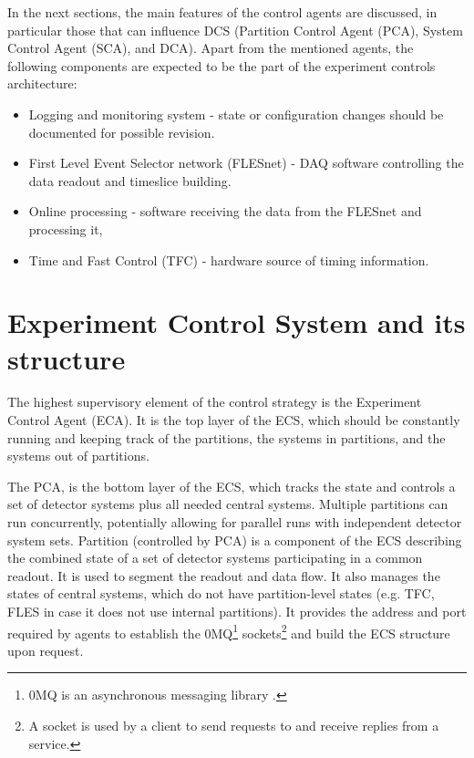  In the next sections, the main features of the control agents are discussed, in particular those that can influence \gls{DCS} (Partition Control Agent (\gls{PCA}), System Control Agent (\gls{SCA}), and \gls{DCA}). Apart from the mentioned agents, the following components are expected to be the part of the experiment controls architecture: 
 \begin{itemize}
     \item Logging and monitoring system - state or configuration changes should be documented for possible revision.
     \item First Level Event Selector network (FLESnet) - \gls{DAQ} software controlling the data readout and timeslice building.
     \item Online processing - software receiving the data from the FLESnet and processing it,
     \item Time and Fast Control (\gls{TFC}) - hardware source of timing information.
 \end{itemize}
\section{Experiment Control System and its structure}\label{sssAgents}

The highest supervisory element of the control strategy is the Experiment Control Agent (\gls{ECA}). It is the top layer of the \gls{ECS}, which should be constantly running and keeping track of the  partitions, the systems in partitions, and the systems out of partitions. 


The \gls{PCA}, is the bottom layer of the \gls{ECS}, which tracks the state and controls a set of detector systems plus all needed central systems. Multiple partitions can run concurrently, potentially allowing for parallel runs with independent detector system sets. Partition (controlled by \gls{PCA}) is a component of the \gls{ECS} describing the combined state of a set of detector systems participating in a common readout. It is used to segment the readout and data flow. It also manages the states of central systems, which do not have partition-level states (e.g. \gls{TFC}, \gls{FLES} in case it does not use internal partitions).  It provides the address and port required by agents to establish the 0MQ\footnote{0MQ is an asynchronous messaging library \cite{zeromq}.} sockets\footnote{A socket is used by a client to send requests to and receive replies from a service.} and build the \gls{ECS} structure upon request.

